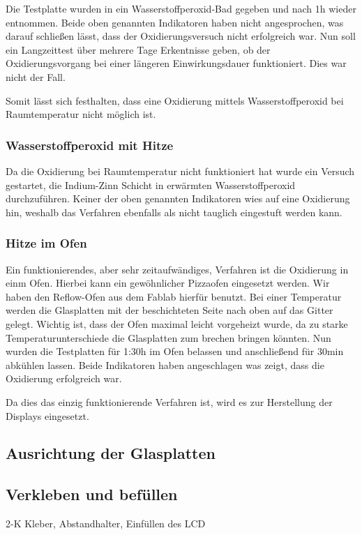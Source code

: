 Die Testplatte wurden in ein Wasserstoffperoxid-Bad gegeben und nach 1h wieder entnommen. Beide oben genannten Indikatoren haben nicht angesprochen, was darauf schließen lässt, dass der Oxidierungsversuch nicht erfolgreich war.
Nun soll ein Langzeittest über mehrere Tage Erkentnisse geben, ob der Oxidierungsvorgang bei einer längeren Einwirkungsdauer funktioniert. Dies war nicht der Fall.

Somit lässt sich festhalten, dass eine Oxidierung mittels Wasserstoffperoxid bei Raumtemperatur nicht möglich ist.

\subsubsection{Wasserstoffperoxid mit Hitze}

Da die Oxidierung bei Raumtemperatur nicht funktioniert hat wurde ein Versuch gestartet, die Indium-Zinn Schicht in erwärmten Wasserstoffperoxid durchzuführen.
Keiner der oben genannten Indikatoren wies auf eine Oxidierung hin, weshalb das Verfahren ebenfalls als nicht tauglich eingestuft werden kann.

\subsubsection{Hitze im Ofen}

Ein funktionierendes, aber sehr zeitaufwändiges, Verfahren ist die Oxidierung in einm Ofen. Hierbei kann ein gewöhnlicher Pizzaofen eingesetzt werden. Wir haben den Reflow-Ofen aus dem Fablab hierfür benutzt.
Bei einer Temperatur werden die Glasplatten mit der beschichteten Seite nach oben auf das Gitter gelegt. Wichtig ist, dass der Ofen maximal leicht vorgeheizt wurde, da zu starke Temperaturunterschiede die Glasplatten zum brechen bringen könnten. Nun wurden die Testplatten für 1:30h im Ofen belassen und anschließend für 30min abkühlen lassen.
Beide Indikatoren haben angeschlagen was zeigt, dass die Oxidierung erfolgreich war.

Da dies das einzig funktionierende Verfahren ist, wird es zur Herstellung der Displays eingesetzt.

\subsection{Ausrichtung der Glasplatten}
\subsection{Verkleben und befüllen}
2-K Kleber, Abstandhalter, Einfüllen des LCD
